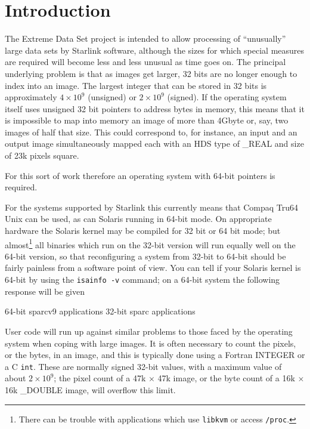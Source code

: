 \documentclass[twoside,11pt,nolof]{starlink}
\providecommand{\file}[1]{\texttt{#1}}
\providecommand{\cc}[1]{\texttt{#1}}
\newenvironment{squote}{\begin{small}}{\end{small}}
\begin{document}
\scfrontmatter



\section{Introduction}

The Extreme Data Set project is intended to allow processing of ``unusually''
large data sets by Starlink software,
although the sizes for which special measures
are required will become less and less unusual as time goes on.
The principal underlying problem is that as images get larger,
32 bits are no longer enough to index into an image.
The largest integer that can be stored in 32 bits
is approximately $4 \times 10^9$ (unsigned) or $2 \times 10^9$ (signed).
If the operating system itself uses unsigned 32 bit pointers to
address bytes
in memory, this means that it is impossible to map into memory
an image of more
than 4Gbyte or, say, two images of half that size.
This could correspond to, for instance, an input and an output image
simultaneously mapped each with an HDS type of \_REAL and
size of 23k pixels square.

For this sort of work therefore an operating system with 64-bit
pointers is required.

For the systems supported by
Starlink this currently means that Compaq Tru64 Unix can be used,
as can Solaris running in 64-bit mode.
On appropriate hardware the Solaris kernel
may be compiled for 32 bit or 64 bit mode;
but almost\footnote{
   There can be trouble with applications which use
   \file{libkvm} or access \file{/proc}.}
all binaries which run on the 32-bit version
will run equally well on the 64-bit version,
so that reconfiguring a system from 32-bit to 64-bit should be
fairly painless from a software point of view.
You can tell if your Solaris kernel is 64-bit
by using the \file{isainfo -v} command; on a 64-bit system the
following response will be given
\begin{squote}
\begin{terminalv}
64-bit sparcv9 applications
32-bit sparc applications
\end{terminalv}
\end{squote}

User code will run up against similar problems to those faced by
the operating system when coping with large images.
It is often necessary to count the pixels, or the bytes,
in an image, and this is typically done using a Fortran INTEGER
or a C \cc{int}.  These are normally signed 32-bit values, with
a maximum value of about $2 \times 10^9$; the pixel count of a
47k $\times$ 47k image, or the byte count of a 16k $\times$ 16k
\_DOUBLE image, will overflow this limit.
\end{document}
